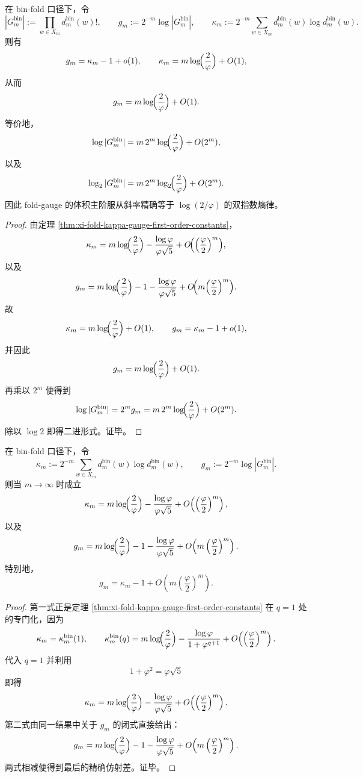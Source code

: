 \begin{theorem}\label{thm:conclusion-binfold-gauge-volume-double-exponential-law}
在 bin-fold 口径下，令
\[
|G_m^{\mathrm{bin}}|:=\prod_{w\in X_m} d_m^{\mathrm{bin}}(w)!,
\qquad
g_m:=2^{-m}\log|G_m^{\mathrm{bin}}|,
\qquad
\kappa_m:=2^{-m}\sum_{w\in X_m}d_m^{\mathrm{bin}}(w)\log d_m^{\mathrm{bin}}(w).
\]
则有
\[
g_m=\kappa_m-1+o(1),
\qquad
\kappa_m=m\log\!\Bigl(\frac{2}{\varphi}\Bigr)+O(1),
\]
从而
\[
g_m=m\log\!\Bigl(\frac{2}{\varphi}\Bigr)+O(1).
\]
等价地，
\[
\log |G_m^{\mathrm{bin}}|
=
m\,2^m\log\!\Bigl(\frac{2}{\varphi}\Bigr)+O(2^m),
\]
以及
\[
\log_2 |G_m^{\mathrm{bin}}|
=
m\,2^m\log_2\!\Bigl(\frac{2}{\varphi}\Bigr)+O(2^m).
\]
因此 fold-gauge 的体积主阶服从斜率精确等于 \(\log(2/\varphi)\) 的双指数熵律。
\end{theorem}
\begin{proof}
由定理 \ref{thm:xi-fold-kappa-gauge-first-order-constants}，
\[
\kappa_m
=
m\log\!\Bigl(\frac{2}{\varphi}\Bigr)
-\frac{\log\varphi}{\varphi\sqrt5}
+O\!\Bigl(\Bigl(\frac{\varphi}{2}\Bigr)^m\Bigr),
\]
以及
\[
g_m
=
m\log\!\Bigl(\frac{2}{\varphi}\Bigr)
-1
-\frac{\log\varphi}{\varphi\sqrt5}
+O\!\Bigl(m\Bigl(\frac{\varphi}{2}\Bigr)^m\Bigr).
\]
故
\[
\kappa_m=m\log\!\Bigl(\frac{2}{\varphi}\Bigr)+O(1),
\qquad
g_m=\kappa_m-1+o(1),
\]
并因此
\[
g_m=m\log\!\Bigl(\frac{2}{\varphi}\Bigr)+O(1).
\]
再乘以 \(2^m\) 便得到
\[
\log |G_m^{\mathrm{bin}}|=2^m g_m
=
m\,2^m\log\!\Bigl(\frac{2}{\varphi}\Bigr)+O(2^m).
\]
除以 \(\log 2\) 即得二进形式。证毕。
\end{proof}

\begin{theorem}[规范体积密度与纤维信息的精确仿射律]\label{thm:conclusion-binfold-kappa-gauge-affine-law}
在 bin-fold 口径下，令
\[
\kappa_m:=2^{-m}\sum_{w\in X_m}d_m^{\mathrm{bin}}(w)\log d_m^{\mathrm{bin}}(w),
\qquad
g_m:=2^{-m}\log|G_m^{\mathrm{bin}}|.
\]
则当 \(m\to\infty\) 时成立
\[
\kappa_m
=
m\log\!\Bigl(\frac{2}{\varphi}\Bigr)
-\frac{\log\varphi}{\varphi\sqrt5}
+O\!\left(\left(\frac{\varphi}{2}\right)^m\right),
\]
以及
\[
g_m
=
m\log\!\Bigl(\frac{2}{\varphi}\Bigr)
-1-\frac{\log\varphi}{\varphi\sqrt5}
+O\!\left(m\left(\frac{\varphi}{2}\right)^m\right).
\]
特别地，
\[
g_m=\kappa_m-1+O\!\left(m\left(\frac{\varphi}{2}\right)^m\right).
\]
\end{theorem}
\begin{proof}
第一式正是定理 \ref{thm:xi-fold-kappa-gauge-first-order-constants} 在 \(q=1\) 处的专门化，因为
\[
\kappa_m=\kappa_m^{\mathrm{bin}}(1),
\qquad
\kappa_m^{\mathrm{bin}}(q)
=
m\log\!\Bigl(\frac{2}{\varphi}\Bigr)
-\frac{\log\varphi}{1+\varphi^{q+1}}
+O\!\left(\left(\frac{\varphi}{2}\right)^m\right).
\]
代入 \(q=1\) 并利用
\[
1+\varphi^2=\varphi\sqrt5
\]
即得
\[
\kappa_m
=
m\log\!\Bigl(\frac{2}{\varphi}\Bigr)
-\frac{\log\varphi}{\varphi\sqrt5}
+O\!\left(\left(\frac{\varphi}{2}\right)^m\right).
\]
第二式由同一结果中关于 \(g_m\) 的闭式直接给出：
\[
g_m
=
m\log\!\Bigl(\frac{2}{\varphi}\Bigr)
-1-\frac{\log\varphi}{\varphi\sqrt5}
+O\!\left(m\left(\frac{\varphi}{2}\right)^m\right).
\]
两式相减便得到最后的精确仿射差。证毕。
\end{proof}

